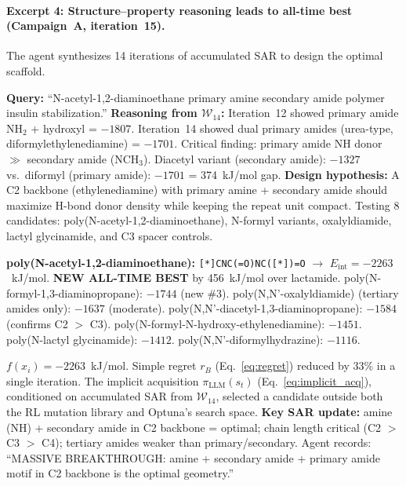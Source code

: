 \documentclass[twocolumn]{fairmeta}
\begin{document}
\paragraph{Excerpt 4: Structure--property reasoning leads to all-time best (Campaign~A, iteration~15).}
The agent synthesizes 14 iterations of accumulated SAR to design the optimal scaffold.

\begin{agentthought}
\scriptsize
\textbf{Query:} ``N-acetyl-1,2-diaminoethane primary amine secondary amide polymer insulin stabilization.''
\textbf{Reasoning from $\mathcal{W}_{14}$:}
Iteration~12 showed primary amide NH$_2$ + hydroxyl = $-1807$.
Iteration~14 showed dual primary amides (urea-type, diformylethylenediamine) = $-1701$.
Critical finding: primary amide NH donor $\gg$ secondary amide (NCH$_3$).
Diacetyl variant (secondary amide): $-1327$ vs.\ diformyl (primary amide): $-1701$ = 374~kJ/mol gap.
\textbf{Design hypothesis:} A C2 backbone (ethylenediamine) with primary amine + secondary amide should maximize H-bond donor density while keeping the repeat unit compact.
Testing 8 candidates: poly(N-acetyl-1,2-diaminoethane), N-formyl variants, oxalyldiamide, lactyl glycinamide, and C3 spacer controls.
\end{agentthought}

\begin{toolcall}
\scriptsize
\textbf{poly(N-acetyl-1,2-diaminoethane):} \texttt{[*]CNC(=O)NC([*])=O} $\to$ $E_\text{int} = -2263$~kJ/mol.
\textbf{NEW ALL-TIME BEST} by 456~kJ/mol over lactamide.
poly(N-formyl-1,3-diaminopropane): $-1744$ (new \#3).
poly(N,N'-oxalyldiamide) (tertiary amides only): $-1637$ (moderate).
poly(N,N'-diacetyl-1,3-diaminopropane): $-1584$ (confirms C2 $>$ C3).
poly(N-formyl-N-hydroxy-ethylenediamine): $-1451$.
poly(N-lactyl glycinamide): $-1412$.
poly(N,N'-diformylhydrazine): $-1116$.
\end{toolcall}

\begin{observation}
\scriptsize
$f(x_i) = -2263$~kJ/mol. Simple regret $r_B$ (Eq.~\ref{eq:regret}) reduced by 33\% in a single iteration.
The implicit acquisition $\pi_\text{LLM}(s_t)$ (Eq.~\ref{eq:implicit_acq}), conditioned on accumulated SAR from $\mathcal{W}_{14}$, selected a candidate outside both the RL mutation library and Optuna's search space.
\textbf{Key SAR update:} amine (NH) + secondary amide in C2 backbone = optimal; chain length critical (C2 $>$ C3 $>$ C4);
tertiary amides weaker than primary/secondary.
Agent records: ``MASSIVE BREAKTHROUGH: amine + secondary amide + primary amide motif in C2 backbone is the optimal geometry.''
\end{observation}
\end{document}
